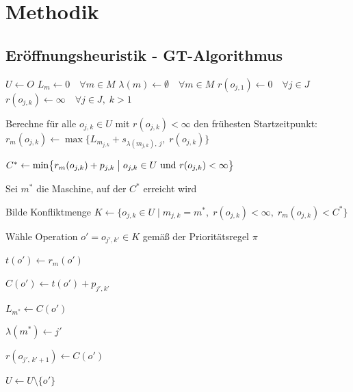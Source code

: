 \chapter{Methodik}
\label{ch:methodik}


\section{Eröffnungsheuristik - GT-Algorithmus}
\label{sec:giffler-thompson}

\begin{algorithm}[H]
    \caption{Giffler-Thompson-Algorithmus}
    \label{alg:giffler_thompson}

    \begin{algorithmic}[1]

        \State $U \gets O$
        \State $L_m \gets 0 \quad \forall m \in M$
        \State $\lambda(m) \gets \emptyset \quad \forall m \in M$
        \State $r(o_{j,1}) \gets 0 \quad \forall j \in J$
        \State $r(o_{j,k}) \gets \infty \quad \forall j \in J, \; k > 1$


        \State Berechne für alle $o_{j,k} \in U$ mit $r(o_{j,k}) < \infty$ den frühesten Startzeitpunkt:
        \Statex \hspace{\algorithmicindent} $r_m(o_{j,k}) \gets \max\{ L_{m_{j,k}} + s_{\lambda(m_{j,k}),\, j},\; r(o_{j,k}) \}$

        \State $C^* \gets \min \bigl\{ r_m(o_{j,k}) + p_{j,k} \bigm| o_{j,k} \in U \text{ und } r(o_{j,k}) < \infty \bigr\}$

        \State Sei $m^*$ die Maschine, auf der $C^*$ erreicht wird

        \State Bilde Konfliktmenge $K \gets \{ o_{j,k} \in U \mid m_{j,k} = m^*, \; r(o_{j,k}) < \infty, \; r_m(o_{j,k}) < C^* \}$

        \State Wähle Operation $o' = o_{j',k'} \in K$ gemäß der Prioritätsregel $\pi$

        \State $t(o') \gets r_m(o')$

        \State $C(o') \gets t(o') + p_{j',k'}$

        \State $L_{m^*} \gets C(o')$

        \State $\lambda(m^*) \gets j'$

        \State $r(o_{j',\, k'+1}) \gets C(o')$
        \EndIf

        \State $U \gets U \setminus \{o'\}$

        \EndWhile

    \end{algorithmic}
\end{algorithm}

